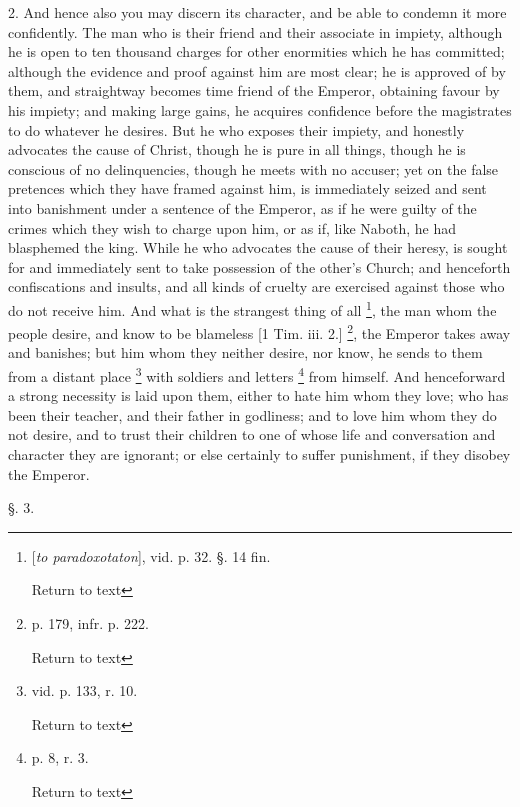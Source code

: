 2. And hence also you may discern its character,
and be able to condemn it more confidently. The man who is their
friend and their associate in impiety, although he is open to ten
thousand charges for other enormities which he has committed; although
the evidence and proof against him are most clear; he is approved of
by them, and straightway becomes time friend of the Emperor, obtaining
favour by his impiety; and making large gains, he acquires confidence
before the magistrates to do whatever he desires. But he who exposes
their impiety, and honestly advocates the cause of Christ, though he
is pure in all things, though he is conscious of no delinquencies,
though he meets with no accuser; yet on the false pretences which they
have framed against him, is immediately seized and sent into
banishment under a sentence of the Emperor, as if he were guilty
of the crimes which they wish to charge upon him, or as if, like
Naboth, he had blasphemed the king. While he who advocates the cause
of their heresy, is sought for and immediately sent to take possession
of the other's Church; and henceforth confiscations and insults, and
all kinds of cruelty are exercised against those who do not receive
him. And what is the strangest thing of all \footnote{[\emph{to paradoxotaton}], vid. p. 32. §. 14 fin.

Return to text}, the man whom the people desire, and know to be blameless [1
Tim. iii. 2.] \footnote{p. 179, infr. p. 222.

Return to text}, the
Emperor takes away and banishes; but him whom they neither desire, nor
know, he sends to them from a distant place \footnote{vid. p. 133, r. 10.

Return to text} with soldiers and letters \footnote{p. 8, r. 3.

Return to text} from himself. And henceforward a strong necessity is laid upon
them, either to hate him whom they love; who has been their teacher,
and their father in godliness; and to love him whom they do not
desire, and to trust their children to one of whose life and
conversation and character they are ignorant; or else certainly to
suffer punishment, if they disobey the Emperor.

§. 3.

